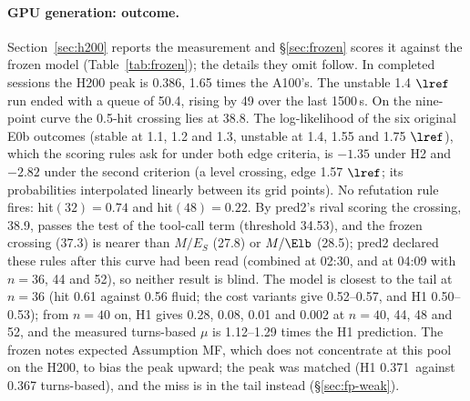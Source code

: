 \paragraph{GPU generation: outcome.} Section~\ref{sec:h200} reports the measurement and \S\ref{sec:frozen} scores it against the frozen model (Table~\ref{tab:frozen}); the details they omit follow. In completed sessions the H200 peak is 0.386\sps, 1.65 times the A100's. The unstable 1.4 $\lref$ run ended with a queue of 50.4, rising by 49 over the last 1500\,s. On the nine-point curve the 0.5-hit crossing lies at 38.8. The log-likelihood of the six original E0b outcomes (stable at 1.1, 1.2 and 1.3, unstable at 1.4, 1.55 and 1.75 $\lref$), which the scoring rules ask for under both edge criteria, is $-1.35$ under H2 and $-2.82$ under the second criterion (a level crossing, edge 1.57 $\lref$; its probabilities interpolated linearly between its grid points). No refutation rule fires: hit$(32)=0.74$ and hit$(48)=0.22$. By pred2's rival scoring the crossing, 38.9, passes the test of the tool-call term (threshold 34.53), and the frozen crossing (37.3) is nearer than $M/E_S$ (27.8) or $M/\Elb$ (28.5); pred2 declared these rules after this curve had been read (combined at 02:30, and at 04:09 with $n=36$, 44 and 52), so neither result is blind. The model is closest to the tail at $n=36$ (hit 0.61 against 0.56 fluid; the cost variants give 0.52--0.57, and H1 0.50--0.53); from $n=40$ on, H1 gives 0.28, 0.08, 0.01 and 0.002 at $n=40$, 44, 48 and 52, and the measured turns-based $\mu$ is 1.12--1.29 times the H1 prediction. The frozen notes expected Assumption MF, which does not concentrate at this pool on the H200, to bias the peak upward; the peak was matched (H1 0.371\sps\ against 0.367 turns-based), and the miss is in the tail instead (\S\ref{sec:fp-weak}).

